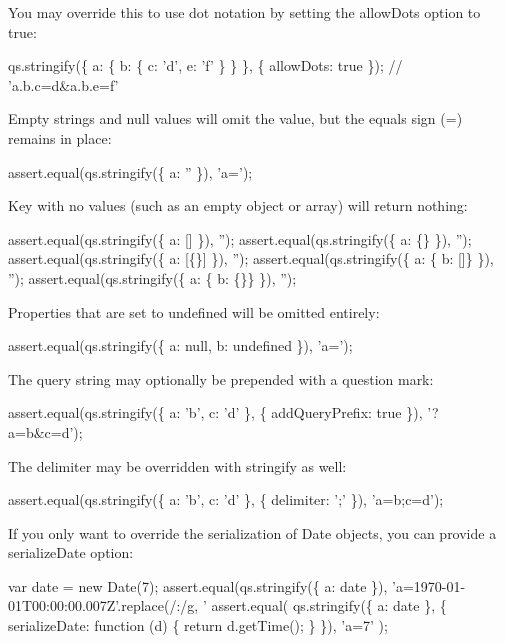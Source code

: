 You may override this to use dot notation by setting the {\ttfamily allow\+Dots} option to {\ttfamily true}\+:


\begin{DoxyCode}
qs.stringify(\{ a: \{ b: \{ c: 'd', e: 'f' \} \} \}, \{ allowDots: true \});
// 'a.b.c=d&a.b.e=f'
\end{DoxyCode}


Empty strings and null values will omit the value, but the equals sign (=) remains in place\+:


\begin{DoxyCode}
assert.equal(qs.stringify(\{ a: '' \}), 'a=');
\end{DoxyCode}


Key with no values (such as an empty object or array) will return nothing\+:


\begin{DoxyCode}
assert.equal(qs.stringify(\{ a: [] \}), '');
assert.equal(qs.stringify(\{ a: \{\} \}), '');
assert.equal(qs.stringify(\{ a: [\{\}] \}), '');
assert.equal(qs.stringify(\{ a: \{ b: []\} \}), '');
assert.equal(qs.stringify(\{ a: \{ b: \{\}\} \}), '');
\end{DoxyCode}


Properties that are set to {\ttfamily undefined} will be omitted entirely\+:


\begin{DoxyCode}
assert.equal(qs.stringify(\{ a: null, b: undefined \}), 'a=');
\end{DoxyCode}


The query string may optionally be prepended with a question mark\+:


\begin{DoxyCode}
assert.equal(qs.stringify(\{ a: 'b', c: 'd' \}, \{ addQueryPrefix: true \}), '?a=b&c=d');
\end{DoxyCode}


The delimiter may be overridden with stringify as well\+:


\begin{DoxyCode}
assert.equal(qs.stringify(\{ a: 'b', c: 'd' \}, \{ delimiter: ';' \}), 'a=b;c=d');
\end{DoxyCode}


If you only want to override the serialization of {\ttfamily Date} objects, you can provide a {\ttfamily serialize\+Date} option\+:


\begin{DoxyCode}
var date = new Date(7);
assert.equal(qs.stringify(\{ a: date \}), 'a=1970-01-01T00:00:00.007Z'.replace(/:/g, '%
assert.equal(
    qs.stringify(\{ a: date \}, \{ serializeDate: function (d) \{ return d.getTime(); \} \}),
    'a=7'
);
\end{DoxyCode}


